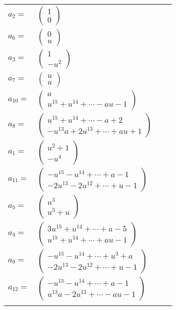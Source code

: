 \documentclass[1p]{elsarticle_modified}
\theoremstyle{definition}
\begin{document}
\begin{tabular}{m{7pt} m{180pt} m{7pt} m{180pt} }
\flushright $a_{2}=$&$\begin{pmatrix}1\\0\end{pmatrix}$ \\
\flushright $a_{6}=$&$\begin{pmatrix}0\\u\end{pmatrix}$ \\
\flushright $a_{3}=$&$\begin{pmatrix}1\\- u^2\end{pmatrix}$ \\
\flushright $a_{7}=$&$\begin{pmatrix}u\\u\end{pmatrix}$ \\
\flushright $a_{10}=$&$\begin{pmatrix}a\\u^{15}+u^{14}+\cdots- a u-1\end{pmatrix}$ \\
\flushright $a_{8}=$&$\begin{pmatrix}u^{15}+u^{14}+\cdots- a+2\\- u^{13} a+2 u^{13}+\cdots+a u+1\end{pmatrix}$ \\
\flushright $a_{1}=$&$\begin{pmatrix}u^2+1\\- u^4\end{pmatrix}$ \\
\flushright $a_{11}=$&$\begin{pmatrix}- u^{15}- u^{14}+\cdots+a-1\\-2 u^{13}-2 u^{12}+\cdots+u-1\end{pmatrix}$ \\
\flushright $a_{5}=$&$\begin{pmatrix}u^3\\u^3+u\end{pmatrix}$ \\
\flushright $a_{4}=$&$\begin{pmatrix}3 u^{15}+u^{14}+\cdots+a-5\\u^{15}+u^{14}+\cdots+a u-1\end{pmatrix}$ \\
\flushright $a_{9}=$&$\begin{pmatrix}- u^{15}- u^{14}+\cdots+u^3+a\\-2 u^{13}-2 u^{12}+\cdots+u-1\end{pmatrix}$ \\
\flushright $a_{12}=$&$\begin{pmatrix}- u^{15}- u^{14}+\cdots+a-1\\u^{13} a-2 u^{13}+\cdots- a u-1\end{pmatrix}$\\&\end{tabular}
\end{document}
